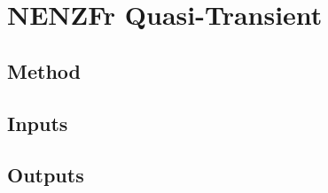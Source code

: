 
\newpage
\section{NENZFr Quasi-Transient}
\label{chapter-quasi-transient}

\subsection{Method}

\subsection{Inputs}

\subsection{Outputs}